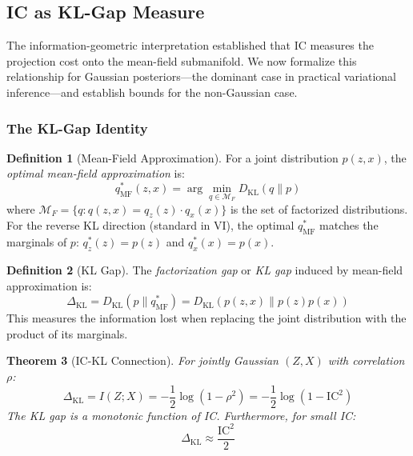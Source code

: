 \documentclass[10pt]{article} %
\theoremstyle{plain}
\newtheorem{theorem}{Theorem}[section]
\theoremstyle{definition}
\newtheorem{definition}[theorem]{Definition}
\newcommand{\IC}{\mathrm{IC}}  %
\begin{document}
\subsection{IC as KL-Gap Measure}
\label{sec:kl-gap}

The information-geometric interpretation established that IC measures the projection cost onto the mean-field submanifold. We now formalize this relationship for Gaussian posteriors---the dominant case in practical variational inference---and establish bounds for the non-Gaussian case.

\subsubsection{The KL-Gap Identity}

\begin{definition}[Mean-Field Approximation]
For a joint distribution $p(z, x)$, the \emph{optimal mean-field approximation} is:
\begin{equation}
q_{\text{MF}}^*(z, x) = \arg\min_{q \in \mathcal{M}_F} D_{\text{KL}}(q \| p)
\end{equation}
where $\mathcal{M}_F = \{q : q(z, x) = q_z(z) \cdot q_x(x)\}$ is the set of factorized distributions. For the reverse KL direction (standard in VI), the optimal $q_{\text{MF}}^*$ matches the marginals of $p$: $q_z^*(z) = p(z)$ and $q_x^*(x) = p(x)$.
\end{definition}

\begin{definition}[KL Gap]
The \emph{factorization gap} or \emph{KL gap} induced by mean-field approximation is:
\begin{equation}
\Delta_{\text{KL}} = D_{\text{KL}}(p \| q_{\text{MF}}^*) = D_{\text{KL}}(p(z,x) \| p(z)p(x))
\end{equation}
This measures the information lost when replacing the joint distribution with the product of its marginals.
\end{definition}

\begin{theorem}[IC-KL Connection]
\label{thm:kl-gap}
For jointly Gaussian $(Z, X)$ with correlation $\rho$:
\begin{equation}
\Delta_{\text{KL}} = I(Z;X) = -\frac{1}{2}\log(1 - \rho^2) = -\frac{1}{2}\log(1 - \IC^2)
\end{equation}
The KL gap is a monotonic function of IC. Furthermore, for small IC:
\begin{equation}
\Delta_{\text{KL}} \approx \frac{\IC^2}{2}
\end{equation}
\end{theorem}
\end{document}
